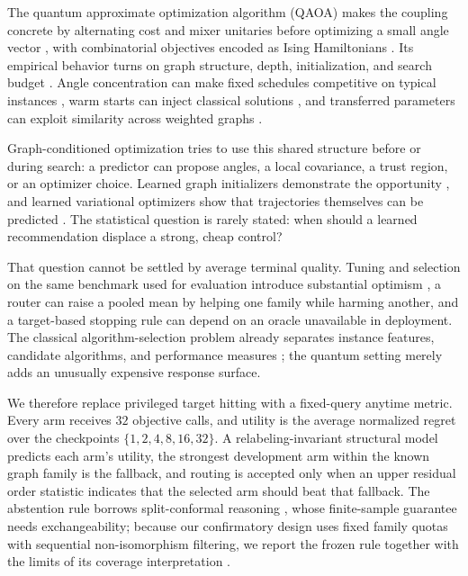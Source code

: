 \documentclass[aps,prx,reprint,superscriptaddress,floatfix]{revtex4-2}
\begin{document}
The quantum approximate optimization algorithm (QAOA) makes the coupling
concrete by alternating cost and mixer unitaries before optimizing a small angle
vector \citep{farhi2014qaoa,hadfield2019alternating}, with combinatorial
objectives encoded as Ising Hamiltonians \citep{lucas2014ising}.  Its empirical
behavior turns on graph structure, depth, initialization, and search budget
\citep{zhou2020qaoa}.  Angle concentration can make fixed schedules competitive
on typical instances \citep{brandao2018fixed,akshay2021concentration}, warm
starts can inject classical solutions \citep{egger2021warm}, and transferred
parameters can exploit similarity across weighted graphs
\citep{shaydulin2023weighted}.

Graph-conditioned optimization tries to use this shared structure before or
during search: a predictor can propose angles, a local covariance, a trust
region, or an optimizer choice.  Learned graph initializers demonstrate the
opportunity \citep{jain2022gnn}, and learned variational optimizers show that
trajectories themselves can be predicted \citep{khairy2020learning}.  The
statistical question is rarely stated: when should a learned recommendation
displace a strong, cheap control?

That question cannot be settled by average terminal quality.  Tuning and
selection on the same benchmark used for evaluation introduce substantial
optimism \citep{cawley2010overfitting}, a router can raise a pooled mean by
helping one family while harming another, and a target-based stopping rule can
depend on an oracle unavailable in deployment.  The classical algorithm-selection
problem already separates instance features, candidate algorithms, and
performance measures \citep{rice1976selection}; the quantum setting merely adds
an unusually expensive response surface.

We therefore replace privileged target hitting with a fixed-query anytime
metric.  Every arm receives $32$ objective calls, and utility is the average
normalized regret over the checkpoints $\{1,2,4,8,16,32\}$.  A
relabeling-invariant structural model predicts each arm's utility, the strongest
development arm within the known graph family is the fallback, and routing is
accepted only when an upper residual order statistic indicates that the selected
arm should beat that fallback.  The abstention rule borrows split-conformal
reasoning \citep{vovk2005algorithmic,angelopoulos2021gentle}, whose finite-sample
guarantee needs exchangeability; because our confirmatory design uses fixed
family quotas with sequential non-isomorphism filtering, we report the frozen
rule together with the limits of its coverage interpretation
\citep{barber2022exchangeability}.
\end{document}
